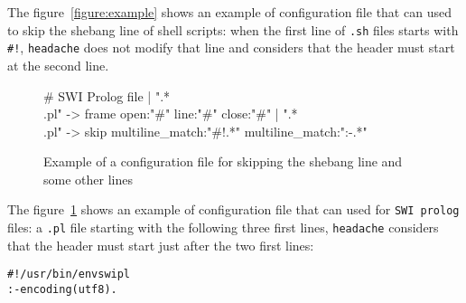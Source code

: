 \documentclass{article}
\newcommand{\mytt}[1]{\texttt{#1}}
\newcommand{\headache}{\mytt{headache}}
\begin{document}
The figure~\ref{figure:example} shows an example of configuration file
that can used to skip the shebang line of shell scripts:
when the first line of \mytt{.sh} files starts with \mytt{\#!},
\headache{} does not modify that line and considers that the header must
start at the second line.

\begin{figure}
\begin{center}
\begin{boxedverbatim}
# SWI Prolog file
 | ".*\\.pl" -> frame open:"#"  line:"#" close:"#"
 | ".*\\.pl" -> skip multiline_match:"#!.*" multiline_match:":-.*"
\end{boxedverbatim}
\end{center}
  \caption{Example of a configuration file for skipping the shebang line and some other lines}
  \label{figure:python-example}
\end{figure}

The figure~\ref{figure:python-example} shows an example of configuration file
that can used for \mytt{SWI prolog} files:
a \mytt{.pl} file starting with the following three first lines,
\headache{} considers that the header must start just after the two first lines:
\begin{alltt}
  #!/usr/bin/env swipl
  :- encoding(utf8).
  % remainder of the file, that can be after the header
\end{alltt}
\end{document}
